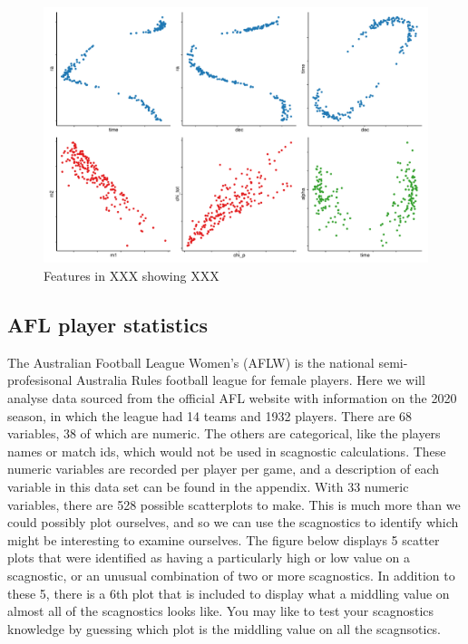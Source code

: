 \begin{Schunk}
\begin{figure}
\includegraphics[width=1\linewidth]{mason-lee-laa-cook_files/figure-latex/blackholes-1} \caption[Features in XXX showing XXX]{Features in XXX showing XXX}\label{fig:blackholes}
\end{figure}
\end{Schunk}

\hypertarget{afl-player-statistics}{%
\subsection{AFL player statistics}\label{afl-player-statistics}}

The Australian Football League Women's (AFLW) is the national
semi-profesisonal Australia Rules football league for female players.
Here we will analyse data sourced from the official AFL website with
information on the 2020 season, in which the league had 14 teams and
1932 players. There are 68 variables, 38 of which are numeric. The
others are categorical, like the players names or match ids, which would
not be used in scagnostic calculations. These numeric variables are
recorded per player per game, and a description of each variable in this
data set can be found in the appendix. With 33 numeric variables, there
are 528 possible scatterplots to make. This is much more than we could
possibly plot ourselves, and so we can use the scagnostics to identify
which might be interesting to examine ourselves. The figure below
displays 5 scatter plots that were identified as having a particularly
high or low value on a scagnostic, or an unusual combination of two or
more scagnostics. In addition to these 5, there is a 6th plot that is
included to display what a middling value on almost all of the
scagnostics looks like. You may like to test your scagnostics knowledge
by guessing which plot is the middling value on all the scagnsotics.

